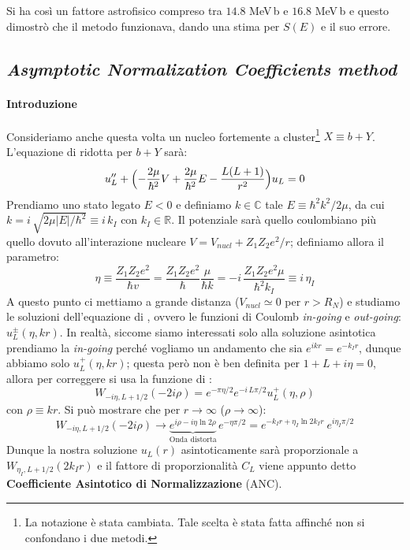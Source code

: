 \noindent Si ha così un fattore astrofisico compreso tra $14.8$ MeV$\,$b e $16.8$ MeV$\,$b e questo dimostrò che il metodo funzionava, dando una stima per $S(E)$ e il suo errore.
\newpage
\subsection{\textit{Asymptotic Normalization Coefficients method}}
\paragraph{Introduzione}
Consideriamo anche questa volta un nucleo fortemente a cluster\footnote{La notazione è stata cambiata. Tale scelta è stata fatta affinché non si confondano i due metodi.} $X\equiv b+Y$. L'equazione di \Sch{} ridotta per $b+Y$ sarà:
$$u_L'' + \Bigl ( -\frac{2\mu }{\hbar^2} V+ \frac{2\mu }{\hbar^2}E - \frac{L(L+1)}{r^2} \Bigr )u_L =0$$
Prendiamo uno stato legato $E<0$ e definiamo $k\in \mathbb{C}$ tale $E\equiv \hbar^2 k^2 / 2\mu$, da cui $k = i\, \sqrt{2\mu |E|/\hbar^2} \equiv i\,k_I$ con $k_I\in \mathbb{R}$. Il potenziale sarà quello coulombiano più quello dovuto all'interazione nucleare $V=V_{nucl} + Z_1Z_2 e^2 /r$; definiamo allora il parametro:
$$\eta \equiv \frac{Z_1Z_2 e^2}{\hbar v} = \frac{Z_1Z_2 e^2}{\hbar}\frac{\mu}{\hbar k} = - i \, \frac{Z_1Z_2 e^2\mu}{\hbar^2 k_I} \equiv i\, \eta_I$$
A questo punto ci mettiamo a grande distanza ($V_{nucl} \simeq 0$ per $r>R_N$) e studiamo le soluzioni dell'equazione di \Sch{}, ovvero le funzioni di Coulomb \textit{in-going} e \textit{out-going}: $u^\pm_L (\eta,kr)$. In realtà, siccome siamo interessati solo alla soluzione asintotica prendiamo la \textit{in-going} perché vogliamo un andamento che sia $e^{ikr}=e^{-k_I r}$, dunque abbiamo solo $u^+_L(\eta,kr)$; questa però non è ben definita per $1+L+i\eta =0$, allora per correggere si usa la funzione di \Wh{}:
$$W_{-i\eta,L+1/2}(-2i\rho) = e^{-\pi\eta/2}e^{-i\,L\pi/2} u^+_L(\eta,\rho)$$
con $\rho\equiv kr$. Si può mostrare che per $r\to\infty$ ($\rho\to\infty$):
$$W_{-i\eta,L+1/2}(-2i\rho) \to \underbrace{e^{i\rho-i\eta\ln{2\rho}}}_\text{Onda distorta} \, e^{-\eta\pi/2} = e^{-k_Ir + \eta_I \ln{2k_Ir}}\: e^{i\eta_I\pi/2}$$
Dunque la nostra soluzione $u_L(r)$ asintoticamente sarà proporzionale a $W_{\eta_I,L+1/2}(2k_I r)$ e il fattore di proporzionalità $C_L$ viene appunto detto \textbf{Coefficiente Asintotico di Normalizzazione} (ANC).

